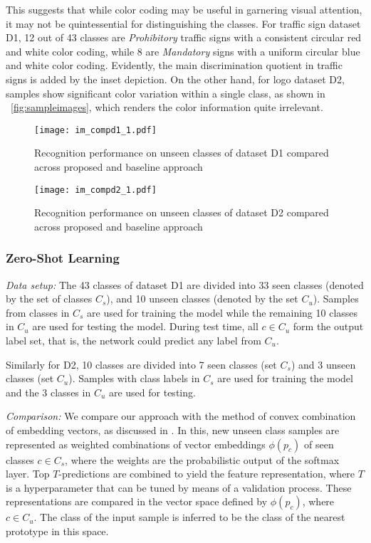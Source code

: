 \documentclass{bmvc2k}
\begin{document}
This suggests that while color coding may be useful in
garnering visual attention, it may not be quintessential for distinguishing the
classes. For traffic sign dataset D1, 12 out of 43 classes
are \textit{Prohibitory} traffic signs with a consistent circular red and white
color coding, while 8 are \textit{Mandatory} signs with a uniform circular blue
and white color coding. Evidently, the main discrimination quotient in traffic signs is added by
the inset depiction. 
On the other hand, for logo dataset D2, samples show significant color
variation within a single class,  as shown in ~\ref{fig:sampleimages}, which
renders the color information quite irrelevant.
\begin{figure}
  \centering
  \texttt{[image: im\_compd1\_1.pdf]}
\caption{\label{fig:comparisonD1}Recognition performance on unseen classes of
dataset D1 compared across proposed and baseline \cite{norouzi2013zero} approach}
\end{figure}\begin{figure}
  \centering
  \texttt{[image: im\_compd2\_1.pdf]}
\caption{\label{fig:comparisonD2}Recognition performance on unseen classes of
dataset D2 compared across proposed and baseline \cite{norouzi2013zero}
approach}
\end{figure}\subsubsection{\label{}Zero-Shot Learning}\textit{Data setup:}  The 43 classes of dataset D1 are
divided into 33 seen classes (denoted by the set of classes $C_s$), and 10 unseen classes (denoted by the 
set $C_u$). Samples from classes in $C_s$ are used for 
training the model while the remaining 10 classes in $C_u$ are used for testing the model. During test time, all $c \in C_u$ form the output 
label set, that is, the network could predict any label from $C_u$.

Similarly for D2, 10 classes are divided into 7 seen classes (set $C_s$) and 3
unseen classes (set $C_u$). Samples with class labels in $C_s$ are used for
training the model and the 3 classes in $C_u$ are used for testing.

\textit{Comparison:} We compare our approach with the method
of convex combination of embedding vectors, as
discussed in \cite{norouzi2013zero}. In this, new unseen class samples are represented as
weighted combinations of vector embeddings $\phi(p_c)$ of seen classes $c \in
C_s$, where the weights are the probabilistic output of the softmax layer. Top
$T$-predictions are combined to yield the feature representation, where $T$ is a
hyperparameter that can be tuned by means of a validation process. These
representations are compared in the vector space defined by
$\phi(p_c)$, where $c \in C_u$.
The class of the input sample is inferred to be the class of the nearest
prototype in this space.
\end{document}
